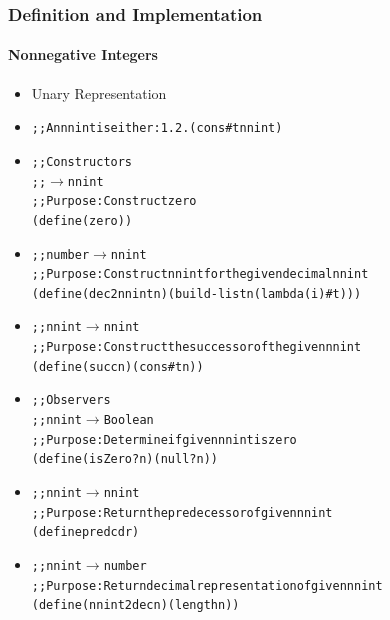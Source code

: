 \documentclass{beamer}
\newcommand{\arrow}{\(\rightarrow\)}
\newcommand{\elist}{\texttt{\textquotesingle{()}}}
\begin{document}
\begin{frame}[fragile]
\frametitle{Definition and Implementation}
\framesubtitle{Nonnegative Integers}
\begin{scriptsize}
\begin{itemize}
\item<1-> Unary Representation

\item<2->
\begin{alltt}
;; An nnint is either: 1. \elist{}  2. (cons \#t nnint)
\end{alltt}

\item<3->
\begin{alltt}
;; Constructors
;;  \arrow{} nnint
;; Purpose: Construct zero
(define (zero) \elist{})
\end{alltt}

\item<4->
\begin{alltt}
;; number \arrow{} nnint
;; Purpose: Construct nnint for the given decimal nnint
(define (dec2nnint n) (build-list n (lambda (i) \#t)))
\end{alltt}

\item<5->
\begin{alltt}
;; nnint \arrow{} nnint
;; Purpose: Construct the successor of the given nnint
(define (succ n) (cons \#t n))
\end{alltt}

\item<6->
\begin{alltt}
;; Observers
;; nnint \arrow{} Boolean
;; Purpose: Determine if given nnint is zero
(define (isZero? n) (null? n))
\end{alltt}

\item<7->
\begin{alltt}
;; nnint \arrow{} nnint
;; Purpose: Return the predecessor of given nnint
(define pred cdr)
\end{alltt}

\item<8->
\begin{alltt}
;; nnint \arrow{} number
;; Purpose: Return decimal representation of given nnint
(define (nnint2dec n) (length n))
\end{alltt}

\end{itemize}
\end{scriptsize}
\end{frame}
\end{document}
